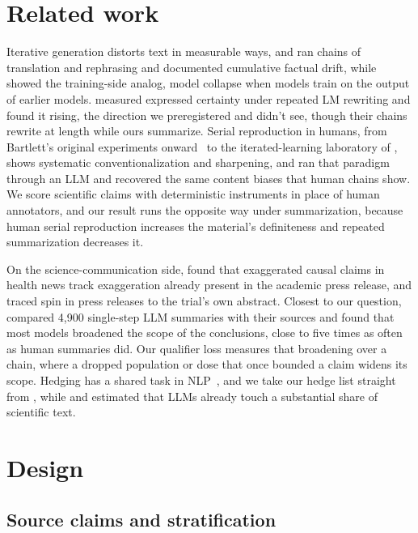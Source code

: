\documentclass{article}
\begin{document}
\section{Related work}

Iterative generation distorts text in measurable ways, and \citet{mohamed2025telephone} ran chains of translation and rephrasing and documented cumulative factual drift, while \citet{shumailov2024collapse} showed the training-side analog, model collapse when models train on the output of earlier models. \citet{belem2026certainty} measured expressed certainty under repeated LM rewriting and found it rising, the direction we preregistered and didn't see, though their chains rewrite at length while ours summarize. Serial reproduction in humans, from Bartlett's original experiments onward~\citep{bartlett1932remembering} to the iterated-learning laboratory of \citet{kirby2008cumulative}, shows systematic conventionalization and sharpening, and \citet{acerbi2023biases} ran that paradigm through an LLM and recovered the same content biases that human chains show. We score scientific claims with deterministic instruments in place of human annotators, and our result runs the opposite way under summarization, because human serial reproduction increases the material's definiteness and repeated summarization decreases it.

On the science-communication side, \citet{sumner2014exaggeration} found that exaggerated causal claims in health news track exaggeration already present in the academic press release, and \citet{yavchitz2012misrepresentation} traced spin in press releases to the trial's own abstract. Closest to our question, \citet{peters2025generalization} compared 4{,}900 single-step LLM summaries with their sources and found that most models broadened the scope of the conclusions, close to five times as often as human summaries did. Our qualifier loss measures that broadening over a chain, where a dropped population or dose that once bounded a claim widens its scope. Hedging has a shared task in NLP~\citep{farkas2010conll}, and we take our hedge list straight from \citet{hyland2005metadiscourse}, while \citet{liang2024mapping} and \citet{kobak2024delving} estimated that LLMs already touch a substantial share of scientific text.

\section{Design}
\label{sec:design}

\subsection{Source claims and stratification}
\end{document}
